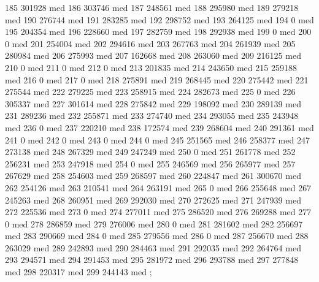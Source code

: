 {185 301928 med
186 303746 med
187 248561 med
188 295980 med
189 279218 med
190 276744 med
191 283285 med
192 298752 med
193 264125 med
194 0 med
195 204354 med
196 228660 med
197 282759 med
198 292938 med
199 0 med
200 0 med
201 254004 med
202 294616 med
203 267763 med
204 261939 med
205 280984 med
206 275993 med
207 162668 med
208 263060 med
209 216125 med
210 0 med
211 0 med
212 0 med
213 201835 med
214 243650 med
215 259188 med
216 0 med
217 0 med
218 275891 med
219 268445 med
220 275442 med
221 275544 med
222 279225 med
223 258915 med
224 282673 med
225 0 med
226 305337 med
227 301614 med
228 275842 med
229 198092 med
230 289139 med
231 289236 med
232 255871 med
233 274740 med
234 293055 med
235 243948 med
236 0 med
237 220210 med
238 172574 med
239 268604 med
240 291361 med
241 0 med
242 0 med
243 0 med
244 0 med
245 251565 med
246 258377 med
247 273138 med
248 267329 med
249 247249 med
250 0 med
251 261778 med
252 256231 med
253 247918 med
254 0 med
255 246569 med
256 265977 med
257 267629 med
258 254603 med
259 268597 med
260 224847 med
261 300670 med
262 254126 med
263 210541 med
264 263191 med
265 0 med
266 255648 med
267 245263 med
268 260951 med
269 292030 med
270 272625 med
271 247939 med
272 225536 med
273 0 med
274 277011 med
275 286520 med
276 269288 med
277 0 med
278 286859 med
279 276006 med
280 0 med
281 281602 med
282 256697 med
283 290669 med
284 0 med
285 279556 med
286 0 med
287 256670 med
288 263029 med
289 242893 med
290 284463 med
291 292035 med
292 264764 med
293 294571 med
294 291453 med
295 281972 med
296 293788 med
297 277848 med
298 220317 med
299 244143 med
};
